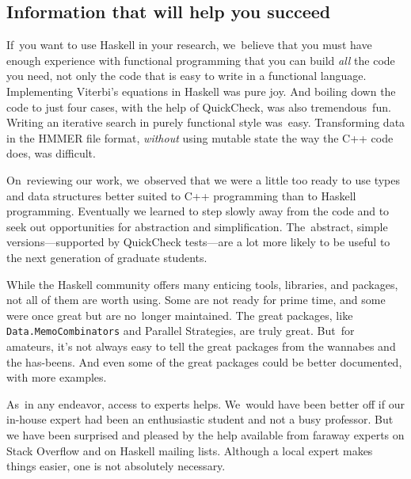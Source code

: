 \documentclass[]{jfp1}
\newcommand\seclabel[1]{\label{sec:#1}}
\begin{document}
\subsection{Information that will help you succeed}

If~you want to use Haskell in your research, we~believe that you must
have enough experience with functional programming that you can build
\emph{all} the code you need, not only the code that is easy to write
in a functional language.
Implementing Viterbi's equations in Haskell was pure joy.
And boiling down the code to just four cases, with the help of
QuickCheck, was also tremendous~fun.
Writing an iterative search in purely functional style was~easy.
Transforming data in the HMMER file format, \emph{without}
using mutable state the way the C++ code does, was difficult.

On~reviewing our work, we~observed that we were a little too ready to
use types and data structures better suited to C++ programming than to
Haskell programming.
Eventually we learned to step slowly away from the code and to seek
out opportunities for abstraction and simplification.
The~abstract, simple versions---supported by QuickCheck tests---are a
lot more likely to be useful to the next generation of graduate students.


\seclabel{penumbra}

While the Haskell community offers many
enticing tools, libraries, and packages,
not all of them are worth using.
Some are not ready for prime time, and some were once great but are
no~longer maintained.
The great packages, like \texttt{Data.MemoCombinators} and Parallel
Strategies, are truly great.
But~for amateurs, it's not always easy to tell the great packages from the wannabes
and the has-beens.
And even some of the great packages could be better documented, with
more examples.



As~in any endeavor, access to experts helps.
We~would have been better off if our in-house expert had been an
enthusiastic student and not a busy professor.
But we have been surprised and pleased by the help available from
faraway experts on Stack Overflow and on Haskell mailing lists.
Although a local expert makes things easier, one is not
 absolutely necessary.
\end{document}
